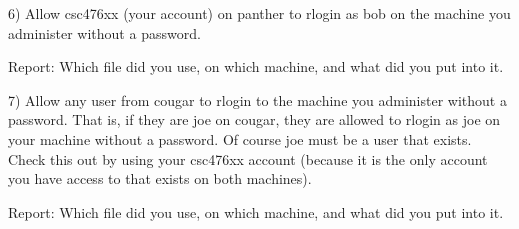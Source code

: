 6) Allow csc476xx (your account) on {\ltt{}panther} to rlogin as bob 
on the machine you administer without a password.

Report: Which file did you use, on which machine, and what did you put into it.

7) Allow any user from {\ltt{}cougar} to rlogin to the machine you administer 
without a password.
That is, if they are joe on {\ltt{}cougar}, they are allowed to rlogin as
joe on your
machine without a password. Of course joe must be  a user that exists.
Check this out by using your csc476xx account (because it is the only
account you have access to that exists on both machines).

Report: Which file did you use, on which machine, and what did you put into it.
\bye
